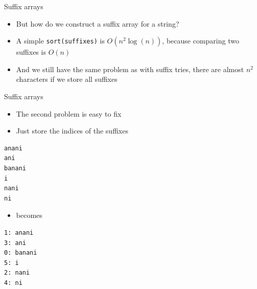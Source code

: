 \documentclass{beamer}
\begin{document}
\begin{frame}{Suffix arrays}
    \begin{itemize}
        \item But how do we construct a suffix array for a string?
            \vspace{10pt}
        \item A simple \texttt{sort(suffixes)} is $O(n^2\log(n))$, because comparing two suffixes is $O(n)$
        \item And we still have the same problem as with suffix tries, there are almost $n^2$ characters if we store all suffixes
    \end{itemize}
\end{frame}

\begin{frame}[fragile]{Suffix arrays}
    \begin{itemize}
        \item The second problem is easy to fix
        \item Just store the indices of the suffixes
    \end{itemize}
    \begin{verbatim}
anani
ani
banani
i
nani
ni
    \end{verbatim}
    \begin{itemize}
        \item becomes
    \end{itemize}
    \begin{verbatim}
1: anani
3: ani
0: banani
5: i
2: nani
4: ni
    \end{verbatim}
\end{frame}
\end{document}
